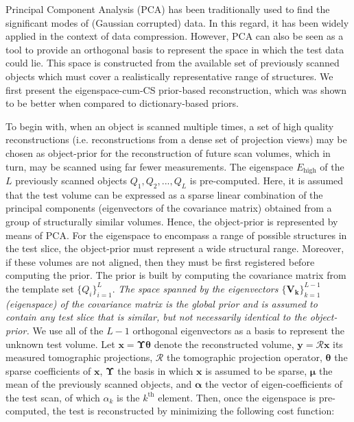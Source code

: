 \documentclass[journal]{IEEEtran}
\begin{document}
Principal Component Analysis (PCA) has been traditionally used to find the significant modes of (Gaussian corrupted) data. In this regard, it has been widely applied in the context of data compression. However, PCA can also be seen as a tool to provide an orthogonal basis to represent the space in which the test data could lie. This space is constructed from the available set of previously scanned objects which must cover a realistically representative range of structures. We first present the eigenspace-cum-CS prior-based reconstruction, which was shown~\cite{my_dicta_paper} to be better when compared to dictionary-based priors. %

To begin with, when an object is scanned multiple times, a set of high quality reconstructions (i.e. reconstructions from a dense set of projection views) may be chosen as object-prior for the reconstruction of future scan volumes, which in turn, may be scanned using far fewer measurements. The eigenspace $E_{\text{high}}$ of the $L$ previously scanned objects $Q_1,Q_2,...,Q_L$ is pre-computed. Here, it is assumed that the test volume can be expressed as a sparse linear combination of the principal components (eigenvectors of the covariance matrix) obtained from a group of structurally similar volumes. Hence, the object-prior is represented by means of PCA. For the eigenspace to encompass a range of possible structures in the test slice, the object-prior must represent a wide structural range. Moreover, if these volumes are not aligned, then they must be first registered before computing the prior. The prior is built by computing the covariance matrix from the template set $\{Q_i\}_{i=1}^L$. \emph{The space spanned by the eigenvectors $\{\boldsymbol{V_k}\}_{k=1}^{L-1}$ (eigenspace) of the covariance matrix is the global prior and is assumed to contain any test slice that is similar, but not necessarily identical to the object-prior.}  We use all of the $L-1$ orthogonal eigenvectors as a basis to represent the unknown test volume. Let $\boldsymbol{x} = \boldsymbol{\Upsilon\theta}$ denote the reconstructed volume, $\boldsymbol{y} = \boldsymbol{\mathcal{R} x}$ its measured tomographic projections, $\boldsymbol{\mathcal{R}}$ the tomographic projection operator, $\boldsymbol{\theta}$ the sparse coefficients of $\boldsymbol{x}$, $\boldsymbol{\Upsilon}$ the basis in which $\boldsymbol{x}$ is assumed to be sparse, $\boldsymbol{\mu}$ the mean of the previously scanned objects, and $\boldsymbol{\alpha}$ the vector of eigen-coefficients of the test scan, of which $\alpha_k$ is the $k^{\textrm{th}}$ element. Then, once the eigenspace is pre-computed, the test is reconstructed by minimizing the following cost function:
\end{document}

